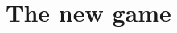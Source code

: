 \documentclass[11pt,letterpaper]{article}
\newcommand{\ket}[1]{|#1\rangle}
\newcommand{\bra}[1]{\langle#1|}
\DeclareMathOperator{\supp}{supp}
\newcommand{\1}{\mathbb{1}}
\newcommand{\SVT}{SVT}
\theoremstyle{definition}
\begin{document}
\section{The new game} 
\label{sec:main}
\end{document}
